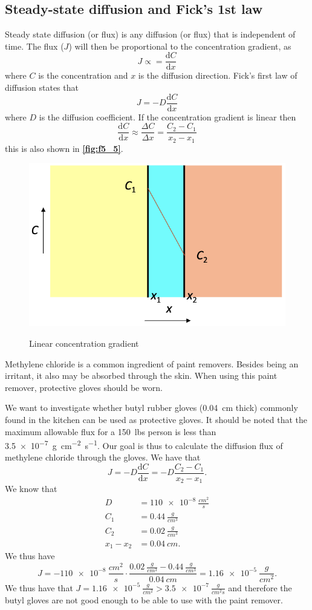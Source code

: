 \subsection{Steady-state diffusion and Fick's 1st law}
Steady state diffusion (or flux) is any diffusion (or flux) that is independent of time. The flux ($J$) will then be proportional to the concentration gradient, as
\[ 
J \propto = \frac{\mathrm{d}C}{\mathrm{d}x} 
\]
where $C$ is the concentration and $x$ is the diffusion direction. Fick's first law of diffusion states that
\[ 
J = - D \frac{\mathrm{d}C}{\mathrm{d}x} 
\]
where $D$ is the diffusion coefficient. If the concentration gradient is linear then
\[ 
\frac{\mathrm{d}C}{\mathrm{d}x} \approx \frac{\Delta C}{\Delta x} = \frac{C_2 - C_1}{x_2 - x_1} 
\]
this is also shown in \textbf{\autoref{fig:f5_5}}.
\begin{figure} [ht]
  \centering
  \caption{Linear concentration gradient}
  \includegraphics[width=0.5\linewidth]{./figures/f5_5.png}
  \label{fig:f5_5}
\end{figure}

\begin{exa}
  Methylene chloride is a common ingredient of paint removers. Besides being an irritant, it also may be absorbed through the skin. When using this paint remover, protective gloves should be worn.

  We want to investigate whether butyl rubber gloves (\qty{0,04}{cm} thick) commonly found in the kitchen can be used as protective gloves. It should be noted that the maximum allowable flux for a \qty{150}{lbs} person is less than \qty{3,5e-7}{\g.\cm^{-2}.\s^{-1}}. Our goal is thus to calculate the diffusion flux of methylene chloride through the gloves. We have that
  \[ 
  J = -D \frac{\mathrm{d}C}{\mathrm{d}x} = -D \frac{C_2 - C_1}{x_2 - x_1}
  .\]
  We know that
  \begin{align*}
    D  &= \qty{110e-8}{\frac{cm^2}{s}} \\
    C_1 &= \qty{0,44}{\frac{g}{cm^3}}  \\
    C_2 &= \qty{0,02}{\frac{g}{cm^3}} \\
    x_1 - x_2 &= \qty{0,04}{cm} 
  .\end{align*}
  We thus have
  \[ 
  J = -\qty{110e-8}{\frac{cm^2}{s}} \cdot \frac{\qty{0,02}{\frac{g}{cm^3}} - \qty{0,44}{\frac{g}{cm^3}}}{\qty{0,04}{cm}} = \qty{1.16e-5}{\frac{g}{cm^2}}
  .\]
  We thus have that $J = \qty{1,16e-5}{\frac{g}{cm^2}} > \qty{3,5e-7}{\frac{g}{cm^2 s}}$ and therefore the butyl gloves are not good enough to be able to use with the paint remover.
\end{exa}

